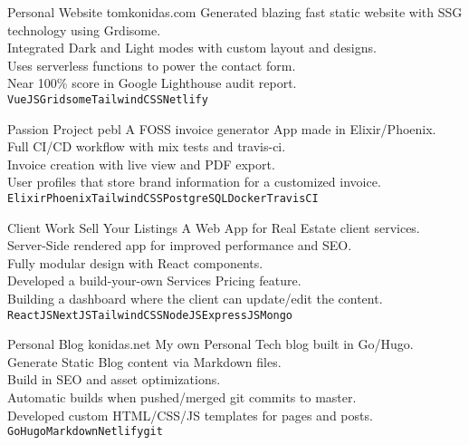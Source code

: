 \documentclass[9pt]{developercv} %
\begin{document}


\begin{entrylist}
	\entry
		{Personal Website}
		{tomkonidas.com}
		{}
		{Generated blazing fast static website with SSG technology using Grdisome.\\
      Integrated Dark and Light modes with custom layout and designs.\\
      Uses serverless functions to power the contact form.\\ 
      Near 100\% score in Google Lighthouse audit report.
      \\\texttt{VueJS}\slashsep\texttt{Gridsome}\slashsep\texttt{TailwindCSS}\slashsep\texttt{Netlify}}

	\entry
		{Passion Project}
		{pebl}
		{}
		{A FOSS invoice generator App made in Elixir/Phoenix.\\
      Full CI/CD workflow with mix tests and travis-ci.\\
      Invoice creation with live view and PDF export.\\ 
      User profiles that store brand information for a customized invoice.
      \\\texttt{Elixir}\slashsep\texttt{Phoenix}\slashsep\texttt{TailwindCSS}\slashsep\texttt{PostgreSQL}\slashsep\texttt{Docker}\slashsep\texttt{TravisCI}}

	\entry
		{Client Work}
		{Sell Your Listings}
		{}
		{A Web App for Real Estate client services.\\
      Server-Side rendered app for improved performance and SEO.\\
      Fully modular design with React components.\\
      Developed a build-your-own Services Pricing feature.\\ 
      Building a dashboard where the client can update/edit the content.
      \\\texttt{ReactJS}\slashsep\texttt{NextJS}\slashsep\texttt{TailwindCSS}\slashsep\texttt{NodeJS}\slashsep\texttt{ExpressJS}\slashsep\texttt{Mongo}}

	\entry
		{Personal Blog}
		{konidas.net}
		{}
		{My own Personal Tech blog built in Go/Hugo.\\
      Generate Static Blog content via Markdown files.\\
      Build in SEO and asset optimizations.\\
      Automatic builds when pushed/merged git commits to master.\\
      Developed custom HTML/CSS/JS templates for pages and posts.
      \\\texttt{Go}\slashsep\texttt{Hugo}\slashsep\texttt{Markdown}\slashsep\texttt{Netlify}\slashsep\texttt{git}}


\end{entrylist}
\end{document}
